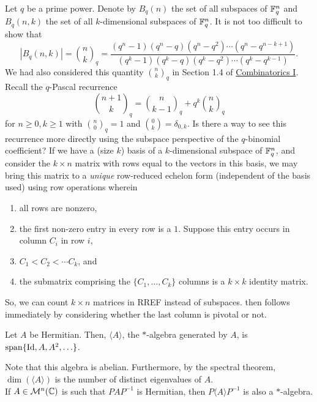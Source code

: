	Let $q$ be a prime power. Denote by $B_q(n)$ the set of all subspaces of $\mathbb{F}_q^n$ and $B_q(n,k)$ the set of all $k$-dimensional subspaces of $\mathbb{F}_q^n$. It is not too difficult to show that
	\[ |B_q(n,k)| = \binom{n}{k}_q = \frac{(q^n-1)(q^n-q)(q^n-q^2)\cdots(q^n-q^{n-k+1})}{(q^k-1)(q^k-q)(q^k-q^2)\cdots(q^k-q^{k-1})}. \]
	We had also considered this quantity $\binom{n}{k}_q$ in Section 1.4 of \href{https://amitrajaraman.github.io/notes/ma-861/main.pdf}{Combinatorics I}. Recall the $q$-Pascal recurrence
	\begin{equation}
		\label{eqn: q-pascal}
		\binom{n+1}{k}_q = \binom{n}{k-1}_q + q^k \binom{n}{k}_q
	\end{equation}
	for $n\ge 0, k \ge 1$ with $\binom{n}{0}_q = 1$ and $\binom{0}{k} = \delta_{0,k}$. Is there a way to see this recurrence more directly using the subspace perspective of the $q$-binomial coefficient? If we have a (size $k$) basis of a $k$-dimensional subspace of $\mathbb{F}_q^n$, and consider the $k \times n$ matrix with rows equal to the vectors in this basis, we may bring this matrix to a \emph{unique} row-reduced echelon form (independent of the basis used) using row operations wherein
	\begin{enumerate}[label=(\roman*)]
		\item all rows are nonzero,
		\item the first non-zero entry in every row is a $1$. Suppose this entry occurs in column $C_i$ in row $i$,
		\item $C_1 < C_2 < \cdots C_k$, and
		\item the submatrix comprising the $\{C_1,\ldots,C_k\}$ columns is a $k \times k$ identity matrix.
	\end{enumerate}
	So, we can count $k \times n$ matrices in RREF instead of subspaces.  then follows immediately by considering whether the last column is pivotal or not.

	\begin{fdef}
		Let $A$ be Hermitian. Then, $\langle A\rangle$, the $*$-algebra generated by $A$, is $\operatorname{span}\{\operatorname{Id},A,A^2,\ldots\}$.
	\end{fdef}

	Note that this algebra is abelian. Furthermore, by the spectral theorem, $\dim(\langle A\rangle)$ is the number of distinct eigenvalues of $A$.\\ %

	If $A \in \mathcal{M}^n(\mathbb{C})$ is such that $PAP^{-1}$ is Hermitian, then $P\langle A\rangle P^{-1}$ is also a $*$-algebra.
	
